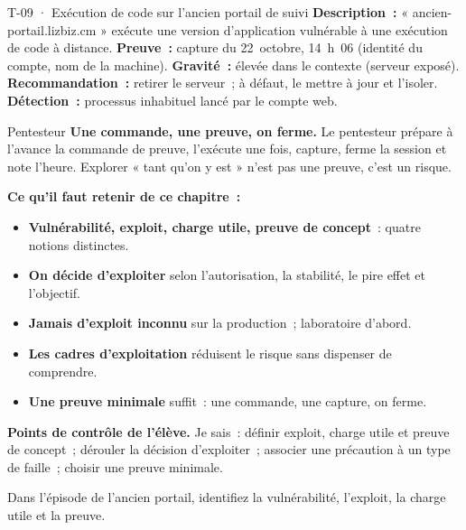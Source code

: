 \begin{boxobjet}{T-09 · Exécution de code sur l'ancien portail de suivi}
\textbf{Description~:} « ancien-portail.lizbiz.cm » exécute une version
d'application vulnérable à une exécution de code à distance.
\textbf{Preuve~:} capture du 22~octobre, 14~h~06 (identité du compte, nom
de la machine). \textbf{Gravité~:} élevée dans le contexte (serveur exposé).
\textbf{Recommandation~:} retirer le serveur~; à défaut, le mettre à jour et
l'isoler. \textbf{Détection~:} processus inhabituel lancé par le compte web.
\end{boxobjet}

\begin{boxmetier}{Pentesteur}
\textbf{Une commande, une preuve, on ferme.} Le pentesteur prépare à
l'avance la commande de preuve, l'exécute une fois, capture, ferme la
session et note l'heure. Explorer « tant qu'on y est » n'est pas une preuve,
c'est un risque.
\end{boxmetier}

\separateur

\begin{boxresume}
\textbf{Ce qu'il faut retenir de ce chapitre~:}
\begin{itemize}
    \item \textbf{Vulnérabilité, exploit, charge utile, preuve de concept}~:
          quatre notions distinctes.
    \item \textbf{On décide d'exploiter} selon l'autorisation, la stabilité,
          le pire effet et l'objectif.
    \item \textbf{Jamais d'exploit inconnu} sur la production~; laboratoire
          d'abord.
    \item \textbf{Les cadres d'exploitation} réduisent le risque sans
          dispenser de comprendre.
    \item \textbf{Une preuve minimale} suffit~: une commande, une capture,
          on ferme.
\end{itemize}
\end{boxresume}

\begin{boxinfo}
\textbf{Points de contrôle de l'élève.} Je sais~: définir exploit, charge
utile et preuve de concept~; dérouler la décision d'exploiter~; associer
une précaution à un type de faille~; choisir une preuve minimale.
\end{boxinfo}

\bigskip

\begin{boxexo}[title={\ding{45}\quad Exercice~8.1. Vocabulaire \niveaubase}]
Dans l'épisode de l'ancien portail, identifiez la vulnérabilité, l'exploit,
la charge utile et la preuve.
\end{boxexo}

